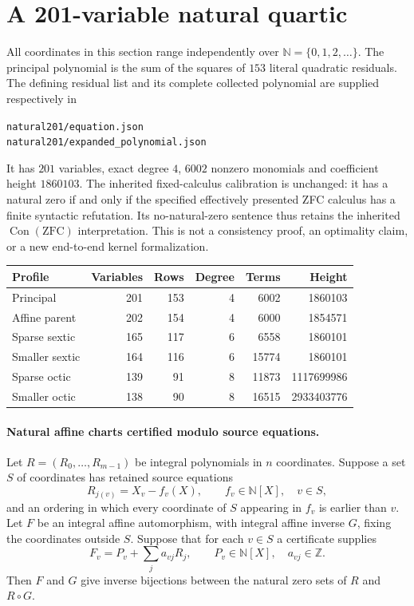 \section{A 201-variable natural quartic}

All coordinates in this section range independently over
$\mathbb N=\{0,1,2,\ldots\}$. The principal polynomial is the sum of the
squares of $153$ literal quadratic residuals. The defining residual list
and its complete collected polynomial are supplied respectively in
\begin{center}\small
\texttt{natural201/equation.json}\\
\texttt{natural201/expanded\_polynomial.json}
\end{center}
It has $201$ variables, exact
degree $4$, $6002$ nonzero monomials and coefficient height $1860103$.
The inherited fixed-calculus calibration is unchanged: it has a natural zero
if and only if the specified effectively presented ZFC calculus has a finite
syntactic refutation. Its no-natural-zero sentence thus retains the inherited
$\operatorname{Con}(\mathrm{ZFC})$ interpretation. This is not a consistency
proof, an optimality claim, or a new end-to-end kernel formalization.

\begin{center}
\begin{tabular}{lrrrrr}
Profile & Variables & Rows & Degree & Terms & Height\\\hline
Principal &201&153&4&6002&1860103\\
Affine parent &202&154&4&6000&1854571\\
Sparse sextic &165&117&6&6558&1860101\\
Smaller sextic &164&116&6&15774&1860101\\
Sparse octic &139&91&8&11873&1117699986\\
Smaller octic &138&90&8&16515&2933403776
\end{tabular}
\end{center}

\paragraph{Natural affine charts certified modulo source equations.}
Let $R=(R_0,\ldots,R_{m-1})$ be integral polynomials in $n$ coordinates.
Suppose a set $S$ of coordinates has retained source equations
\[
 R_{j(v)}=X_v-f_v(X),\qquad f_v\in\mathbb N[X],\quad v\in S,
\]
and an ordering in which every coordinate of $S$ appearing in $f_v$ is
earlier than $v$. Let $F$ be an integral affine automorphism, with integral
affine inverse $G$, fixing the coordinates outside $S$. Suppose that for each
$v\in S$ a certificate supplies
\[
 F_v=P_v+\sum_j a_{vj}R_j,\qquad P_v\in\mathbb N[X],\quad a_{vj}\in\mathbb Z.
 \tag{N1}
\]
Then $F$ and $G$ give inverse bijections between the natural zero sets of
$R$ and $R\circ G$.

